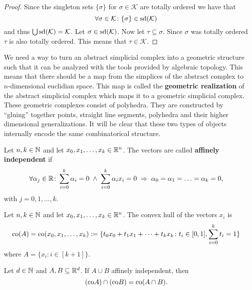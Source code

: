 \begin{proof}
    Since the singleton sets $\{\sigma\}$ for $\sigma \in \mathcal{K}$ are totally ordered we have that \[\forall \sigma\in \mathcal{K}\colon \{\sigma\} \in {\rm sd}(\mathcal{K})\] and thus $\bigcup {\rm sd}(\mathcal{K}) = \mathcal{K}$. Let $\sigma \in {\rm sd}(\mathcal{K})$. Now let $\tau \subseteq \sigma$. Since $\sigma$ was totally ordered $\tau$ is also totally ordered.
    This means that $\tau \in \mathcal{K}$.
\end{proof}

We need a way to turn an abstract simplicial complex into a geometric structure such that it can be analyzed with the tools provided by algebraic topology. This means that there should be a map from the simplices of the abstract complex to $n$-dimensional euclidian space. This map is called the \textbf{geometric realization} of the abstract simplicial complex which maps it to a geometric simplicial complex. 
These geometric complexes consist of polyhedra. They are constructed by ``gluing'' 
together points, straight line segments, polyhedra and their higher dimensional generalizations.
It will be clear that these two types of objects internally encode the same combinatorical structure. 

\begin{defin}
    Let $n,k \in \mathbb{N}$ and let $x_0, x_1, \ldots, x_k \in \mathbb{R}^n$. 
    The vectors are called \textbf{affinely independent} if
    \begin{equation*}
        \forall \alpha_j\in \mathbb{R}\colon \sum\limits_{i=0}^k \alpha_i = 0 \; \land \; \sum\limits_{i=0}^k \alpha_i x_i = 0 \; \Rightarrow \; \alpha_0 = \alpha_1 = \ldots = \alpha_k = 0, 
    \end{equation*} with $j = 0, 1, \ldots, k$.
\end{defin}

\begin{defin}
    Let $n,k \in \mathbb{N}$ and let $x_0, x_1, \ldots, x_k \in \mathbb{R}^n$. The convex hull of the vectors $x_i$ is
    \begin{equation*}
        {\rm co} (A) = {\rm co}(x_0, x_1, \ldots, x_k) := \{ t_0 x_0 + t_1 x_1 + \cdots + t_k x_k \colon t_i \in [0, 1], \sum\limits_{i=0}^k t_i = 1\}
    \end{equation*}
    where $A = \{x_i\colon i \in [k+1]\}$.  
\end{defin}

\begin{rem}
  Let $d\in\mathbb{N}$ and $A,B \subseteq \mathbb{R}^d$. If $A \cup B$ affinely independent, then
  \begin{equation*}
    ({\rm co} A) \cap ({\rm co}B) = {\rm co}(A \cap B).
  \end{equation*}
\end{rem}

